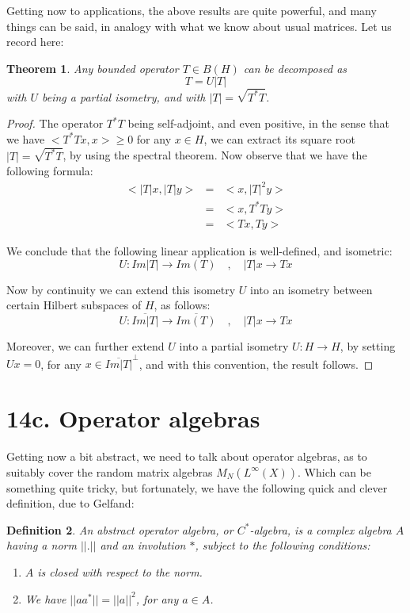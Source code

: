 \documentclass[12pt]{amsbook}
\newtheorem{theorem}{Theorem}[chapter]
\newtheorem{definition}[theorem]{Definition}
\begin{document}
Getting now to applications, the above results are quite powerful, and many things can be said, in analogy with what we know about usual matrices. Let us record here:


\begin{theorem}
Any bounded operator $T\in B(H)$ can be decomposed as
$$T=U|T|$$
with $U$ being a partial isometry, and with $|T|=\sqrt{T^*T}$.
\end{theorem}

\begin{proof}
The operator $T^*T$ being self-adjoint, and even positive, in the sense that we have $<T^*Tx,x>\geq0$ for any $x\in H$, we can extract its square root $|T|=\sqrt{T^*T}$, by using the spectral theorem. Now observe that we have the following formula:
\begin{eqnarray*}
<|T|x,|T|y>
&=&<x,|T|^2y>\\
&=&<x,T^*Ty>\\
&=&<Tx,Ty>
\end{eqnarray*}

We conclude that the following linear application is well-defined, and isometric:
$$U:Im|T|\to Im(T)\quad,\quad 
|T|x\to Tx$$

Now by continuity we can extend this isometry $U$ into an isometry between certain Hilbert subspaces of $H$, as follows:
$$U:\overline{Im|T|}\to\overline{Im(T)}\quad,\quad 
|T|x\to Tx$$

Moreover, we can further extend $U$ into a partial isometry $U:H\to H$, by setting $Ux=0$, for any $x\in\overline{Im|T|}^\perp$, and with this convention, the result follows. 
\end{proof}

\section*{14c. Operator algebras}

Getting now a bit abstract, we need to talk about operator algebras, as to suitably cover the random matrix algebras $M_N(L^\infty(X))$. Which can be something quite tricky, but fortunately, we have the following quick and clever definition, due to Gelfand:

\begin{definition}
An abstract operator algebra, or $C^*$-algebra, is a complex algebra $A$ having a norm $||.||$ and an involution $*$, subject to the following conditions:
\begin{enumerate}
\item $A$ is closed with respect to the norm.

\item We have $||aa^*||=||a||^2$, for any $a\in A$.
\end{enumerate}
\end{definition}
\end{document}
